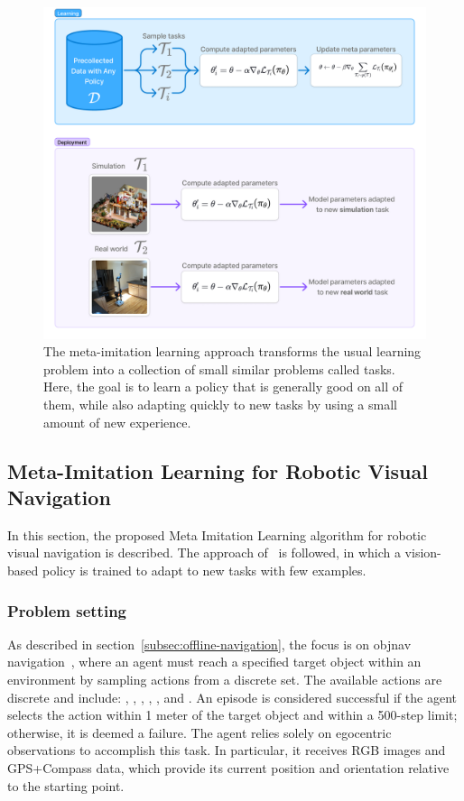 \begin{figure}
    \centering
    \includegraphics[width=0.7\linewidth]{figures/metanav/graphical_abstract}
    \caption[Meta-imitation learning diagram]{
        The meta-imitation learning approach transforms the usual learning problem into a collection of small similar problems called tasks.
        Here, the goal is to learn a policy that is generally good on all of them, while also adapting quickly to new tasks by using a small amount of new experience.
    }
    \label{fig:abstract_metanav}
\end{figure}

\subsection{Meta-Imitation Learning for Robotic Visual Navigation}\label{subsec:meta-imitation-learning-for-robotic-visual-navigation}

In this section, the proposed Meta Imitation Learning algorithm for robotic visual navigation is described.
The approach of~\cite{finnOneShotVisualImitation2017} is followed, in which a vision-based policy is trained to adapt to new tasks with few examples.

\subsubsection{Problem setting}\label{subsubsec:problem-setting}

As described in section~\ref{subsec:offline-navigation}, the focus is on \acrshort{objnav} navigation~\cite{batra2020}, where an agent must reach a specified target object within an environment by sampling actions from a discrete set.
The available actions are discrete and include: \turnleft, \turnright, \moveforward, \lookup, \lookdown, and \stopac.
An episode is considered successful if the agent selects the \stopac action within 1 meter of the target object and within a 500-step limit; otherwise, it is deemed a failure.
The agent relies solely on egocentric observations to accomplish this task.
In particular, it receives RGB images and GPS+Compass data, which provide its current position and orientation relative to the starting point.

